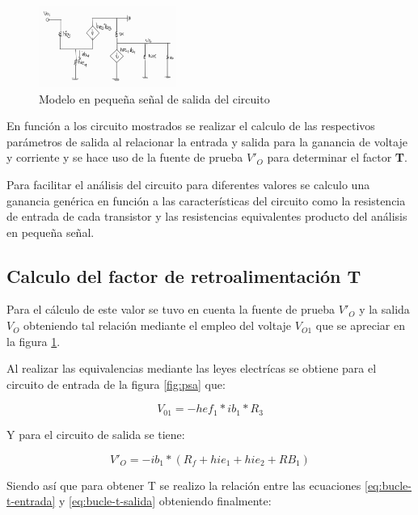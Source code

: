 \documentclass[conference]{IEEEtran}
\begin{document}
    \begin{figure}[h]
        \centering
        \includegraphics[width=0.4\textwidth]{media/psb}
        \caption{Modelo en pequeña señal de salida del circuito}
        \label{fig:psb}
    \end{figure}

    En función a los circuito mostrados se realizar el calculo de las respectivos parámetros de salida al relacionar la entrada y salida para la ganancia de voltaje y corriente y se hace uso de la fuente de prueba $V'_O$ para determinar el factor \textbf{T}.

    Para facilitar el análisis del circuito para diferentes valores se calculo una ganancia genérica en función a las características del circuito como la resistencia de entrada de cada transistor y las resistencias equivalentes producto del análisis en pequeña señal.

    \subsection{Calculo del factor de retroalimentación T}
    Para el cálculo de este valor se tuvo en cuenta la fuente de prueba $V'_O$ y la salida $V_O$ obteniendo tal relación mediante el empleo del voltaje $V_{O1}$ que se apreciar en la figura \ref{fig:psb}.

    Al realizar las equivalencias mediante las leyes electrícas se obtiene para el circuito de entrada de la figura \ref{fig:psa} que:

    \begin{equation}
        V_{01} = -hef_1*ib_1*R_3
		\label{eq:bucle-t-entrada}
	\end{equation}

    Y para el circuito de salida se tiene:

    \begin{equation}
        V'_O = -ib_1*(R_f+hie_1+hie_2 + RB_1)
		\label{eq:bucle-t-salida}
	\end{equation}

    Siendo así que para obtener T se realizo la relación entre las ecuaciones \ref{eq:bucle-t-entrada} y \ref{eq:bucle-t-salida} obteniendo finalmente:
\end{document}
